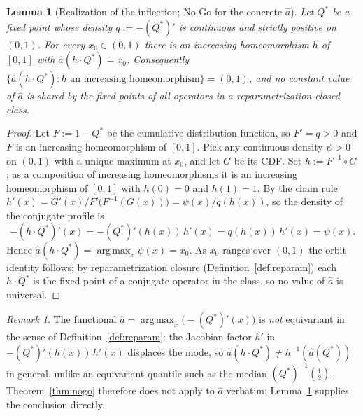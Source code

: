 \documentclass[11pt]{article}
\theoremstyle{plain}
\newtheorem{lemma}[theorem]{Lemma}
\theoremstyle{definition}
\theoremstyle{remark}
\newtheorem{remark}[theorem]{Remark}
\DeclareMathOperator*{\argmax}{arg\,max}
\begin{document}
\begin{lemma}[Realization of the inflection; No-Go for the concrete $\hat a$]\label{lem:realization}
Let $Q^*$ be a fixed point whose density $q:=-(Q^*)'$ is continuous and strictly positive on $(0,1)$. For every $x_0\in(0,1)$ there is an increasing homeomorphism $h$ of $[0,1]$ with $\hat a(h\cdot Q^*)=x_0$. Consequently $\{\hat a(h\cdot Q^*):h\text{ an increasing homeomorphism}\}=(0,1)$, and no constant value of $\hat a$ is shared by the fixed points of all operators in a reparametrization-closed class.
\end{lemma}
\begin{proof}
Let $F:=1-Q^*$ be the cumulative distribution function, so $F'=q>0$ and $F$ is an increasing homeomorphism of $[0,1]$. Pick any continuous density $\psi>0$ on $(0,1)$ with a unique maximum at $x_0$, and let $G$ be its CDF. Set $h:=F^{-1}\circ G$; as a composition of increasing homeomorphisms it is an increasing homeomorphism of $[0,1]$ with $h(0)=0$ and $h(1)=1$. By the chain rule $h'(x)=G'(x)/F'\big(F^{-1}(G(x))\big)=\psi(x)/q(h(x))$, so the density of the conjugate profile is
\[
-(h\cdot Q^*)'(x)=-(Q^*)'(h(x))\,h'(x)=q(h(x))\,h'(x)=\psi(x).
\]
Hence $\hat a(h\cdot Q^*)=\argmax_{x}\psi(x)=x_0$. As $x_0$ ranges over $(0,1)$ the orbit identity follows; by reparametrization closure (Definition~\ref{def:reparam}) each $h\cdot Q^*$ is the fixed point of a conjugate operator in the class, so no value of $\hat a$ is universal.
\end{proof}
\begin{remark}
The functional $\hat a=\argmax_x\big(-(Q^*)'(x)\big)$ is \emph{not} equivariant in the sense of Definition~\ref{def:reparam}: the Jacobian factor $h'$ in $-(Q^*)'(h(x))\,h'(x)$ displaces the mode, so $\hat a(h\cdot Q^*)\neq h^{-1}(\hat a(Q^*))$ in general, unlike an equivariant quantile such as the median $(Q^*)^{-1}(\tfrac12)$. Theorem~\ref{thm:nogo} therefore does not apply to $\hat a$ verbatim; Lemma~\ref{lem:realization} supplies the conclusion directly.
\end{remark}
\end{document}
